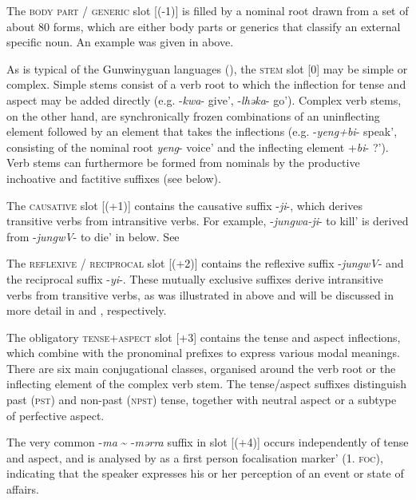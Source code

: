 \documentclass[output=paper]{langscibook}
\begin{document}
The \textsc{body} \textsc{part} \textsc{/} \textsc{generic} slot [(-1)] is filled by a nominal root drawn from a set of about 80 forms, which are either body parts or generics that classify an external specific noun. An example was given in  above.


As is typical of the Gunwinyguan languages (\citealt{BarryEtAl2003}), the \textsc{stem} slot [0] may be simple or complex. Simple stems consist of a verb root to which the inflection for tense and aspect may be added directly (e.g. -\textit{kwa}- give’, -\textit{lhəka}- go’). Complex verb stems, on the other hand, are synchronically frozen combinations of an uninflecting element followed by an element that takes the inflections (e.g. -\textit{yeng+bi}- speak’, consisting of the nominal root \textit{yeng}- voice’ and the inflecting element +\textit{bi}- ?’). Verb stems can furthermore be formed from nominals by the productive inchoative and factitive suffixes (see  below).


The \textsc{causative} slot [(+1)] contains the causative suffix -\textit{ji}-, which derives transitive verbs from intransitive verbs. For example, -\textit{jungwa-ji}- to kill’ is derived from -\textit{jungwV}- to die’ in  below. See 


The \textsc{reflexive} \textsc{/} \textsc{reciprocal} slot [(+2)] contains the reflexive suffix -\textit{jungwV}- and the reciprocal suffix -\textit{yi}-. These mutually exclusive suffixes derive intransitive verbs from transitive verbs, as was illustrated in  above and will be discussed in more detail in  and , respectively.


The obligatory \textsc{tense+aspect} slot [+3] contains the tense and aspect inflections, which combine with the pronominal prefixes to express various modal meanings. There are six main conjugational classes, organised around the verb root or the inflecting element of the complex verb stem. The tense/aspect suffixes distinguish past (\textsc{pst}) and non-past (\textsc{npst}) tense, together with neutral aspect or a subtype of perfective aspect.


The very common -\textit{ma} {\textasciitilde} -\textit{mərra} suffix in slot [(+4)] occurs independently of tense and aspect, and is analysed by \citet[225-236]{VanEgmond2012} as a first person focalisation marker’ (1. \textsc{foc}), indicating that the speaker expresses his or her perception of an event or state of affairs.
\end{document}
